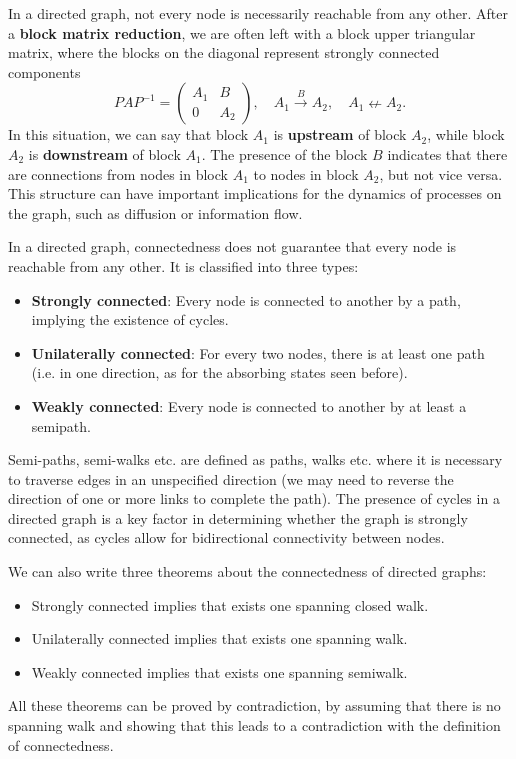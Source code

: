 In a directed graph, not every node is necessarily reachable from any other. After a \textbf{block matrix reduction}, we are often left with a block upper triangular matrix, where the blocks on the diagonal represent strongly connected components
\[
    P A P^{-1} = \begin{pmatrix}
        A_1 & B   \\
        0   & A_2
    \end{pmatrix}, \quad A_1 \xrightarrow{B} A_2, \quad A_1 \nleftarrow A_2.
\]
In this situation, we can say that block $A_1$ is \textbf{upstream} of block $A_2$, while block $A_2$ is \textbf{downstream} of block $A_1$. The presence of the block $B$ indicates that there are connections from nodes in block $A_1$ to nodes in block $A_2$, but not vice versa. This structure can have important implications for the dynamics of processes on the graph, such as diffusion or information flow.

In a directed graph, connectedness does not guarantee that every node is reachable from any other. It is classified into three types:
\begin{itemize}
    \item \textbf{Strongly connected}: Every node is connected to another by a path, implying the existence of cycles.
    \item \textbf{Unilaterally connected}: For every two nodes, there is at least one path (i.e. in one direction, as for the absorbing states seen before).
    \item \textbf{Weakly connected}: Every node is connected to another by at least a semipath.
\end{itemize}
Semi-paths, semi-walks etc. are defined as paths, walks etc. where it is necessary to traverse edges in an unspecified direction (we may need to reverse the direction of one or more links to complete the path). The presence of cycles in a directed graph is a key factor in determining whether the graph is strongly connected, as cycles allow for bidirectional connectivity between nodes.

We can also write three theorems about the connectedness of directed graphs:
\begin{itemize}
    \item Strongly connected implies that exists one spanning closed walk.
    \item Unilaterally connected implies that exists one spanning walk.
    \item Weakly connected implies that exists one spanning semiwalk.
\end{itemize}
All these theorems can be proved by contradiction, by assuming that there is no spanning walk and showing that this leads to a contradiction with the definition of connectedness.

